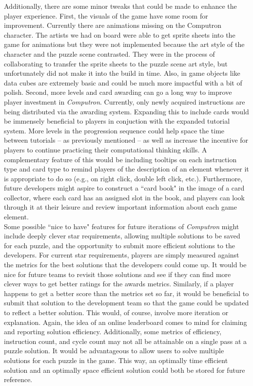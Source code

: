 Additionally, there are some minor tweaks that could be made to enhance the player experience. First, the visuals of the game have some room for improvement. Currently there are animations missing on the Computron character. The artists we had on board were able to get sprite sheets into the game for animations but they were not implemented because the art style of the character and the puzzle scene contrasted. They were in the process of collaborating to transfer the sprite sheets to the puzzle scene art style, but unfortunately did not make it into the build in time. Also, in game objects like data cubes are extremely basic and could be much more impactful with a bit of polish. Second, more levels and card awarding can go a long way to improve player investment in \textit{Computron}. Currently, only newly acquired instructions are being distributed via the awarding system. Expanding this to include cards would be immensely beneficial to players in conjuction with the expanded tutorial system. More levels in the progression sequence could help space the time between tutorials -- as previously mentioned -- as well as increase the incentive for players to continue practicing their computational thinking skills. A complementary feature of this would be including tooltips on each instruction type and card type to remind players of the description of an element whenever it is appropriate to do so (e.g., on right click, double left click, etc.). Furthermore, future developers might aspire to construct a  “card book" in the image of a card collector, where each card has an assigned slot in the book, and players can look through it at their leisure and review important information about each game element.\\

Some possible  “nice to have" features for future iterations of \textit{Computron} might include deeply clever star requirements, allowing multiple solutions to be saved for each puzzle, and the opportunity to submit more efficient solutions to the developers. For current star requirements, players are simply measured against the metrics for the best solutions that the developers could come up. It would be nice for future teams to revisit those solutions and see if they can find more clever ways to get better ratings for the awards metrics. Similarly, if a player happens to get a better score than the metrics set so far, it would be beneficial to submit that solution to the development team so that the game could be updated to reflect a better solution. This would, of course, involve more iteration or explanation. Again, the idea of an online leaderboard comes to mind for claiming and reporting solution efficiency. Additionally, some metrics of efficiency, instruction count, and cycle count may not all be attainable on a single pass at a puzzle solution. It would be advantageous to allow users to solve multiple solutions for each puzzle in the game. This way, an optimally time efficient solution and an optimally space efficient solution could both be stored for future reference.\\


